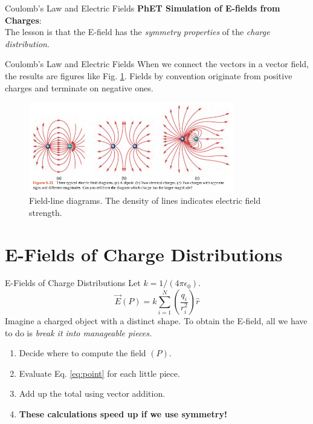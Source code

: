 \documentclass{beamer}
\begin{document}
\begin{frame}{Coulomb’s Law and Electric Fields}
\small
\textbf{PhET Simulation of E-fields from Charges}: \\ \vspace{0.5cm}
\alert{The lesson is that the E-field has the \textit{symmetry properties} of the \textit{charge distribution}}.
\end{frame}

\begin{frame}{Coulomb’s Law and Electric Fields}
When we connect the vectors in a vector field, the results are figures like Fig. \ref{fig:lines}.  Fields by convention originate from positive charges and terminate on negative ones.
\begin{figure}
\includegraphics[width=0.8\textwidth]{figures/lines.png}
\caption{\label{fig:lines} Field-line diagrams.  The density of lines indicates electric field strength.}
\end{figure}
\end{frame}

\section{E-Fields of Charge Distributions}

\begin{frame}{E-Fields of Charge Distributions}
Let $k = 1/(4\pi\epsilon_0)$.
\begin{equation}
\vec{E}(P) = k \sum_{i = 1}^N \left(\frac{q_i}{r_i^2}\right) \hat{r} \label{eq:point}
\end{equation}
Imagine a charged object with a distinct shape. To obtain the E-field, all we have to do is \textit{break it into manageable pieces.}
\begin{enumerate}
\item Decide where to compute the field $(P)$.
\item Evaluate Eq. \ref{eq:point} for each little piece.
\item Add up the total using vector addition.
\item \textbf{These calculations speed up if we use symmetry!}
\end{enumerate}
\end{frame}
\end{document}

